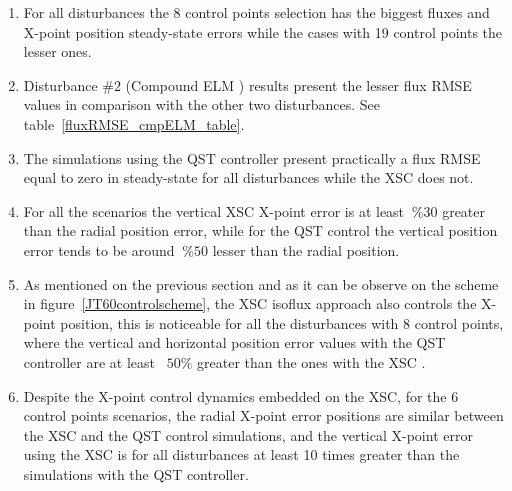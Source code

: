\begin{enumerate}[label=(\alph*)]
	\item  For all disturbances the 8 control points selection has the biggest fluxes and X-point position steady-state errors while the cases with 19 control points the lesser ones.
	\item Disturbance $\#2$ (Compound ELM ) results present the lesser flux RMSE values in comparison with the other two disturbances. See table~\ref{fluxRMSE_cmpELM_table}.
	\item The simulations using the  QST controller present practically a flux RMSE equal to zero in steady-state for all disturbances while the XSC does not.
	\item For all the scenarios  the vertical XSC X-point error is  at least $~\%30$ greater  than the radial position error, while for the QST control the vertical position error tends to be around $~\%50$ lesser than the radial position.
	\item  As mentioned on the previous section and as it can be observe on the scheme in figure~\ref{JT60controlscheme}, the XSC isoflux approach also controls the X-point position, this is  noticeable for all the disturbances with 8 control points, where the vertical and horizontal position error values with the QST controller are at least ~$50 \%$ greater than the ones with the XSC .
	\item Despite the X-point control dynamics embedded on the XSC, for the 6 control points scenarios, the  radial X-point error positions are  similar between the XSC and the QST control simulations, and the vertical X-point error  using the XSC  is for all disturbances at least 10 times greater than the simulations with the QST controller.
\end{enumerate}




